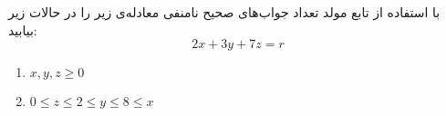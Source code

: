     \p 
با استفاده از تابع مولد تعداد جواب‌های صحیح نامنفی معادله‌ی زیر را در حالات زیر بیابید:
$$2x + 3y + 7z = r$$
\begin{enumerate}
\item
$x, y, z \geq 0$
\item
$0 \leq z \leq 2 \leq y \leq 8 \leq x$
\end{enumerate}